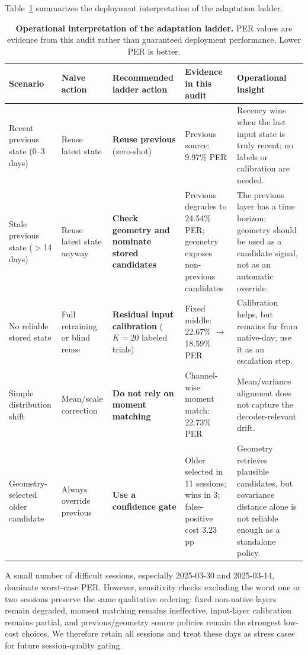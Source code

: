 \documentclass{article}
\begin{document}
Table~\ref{tab:operational-ladder} summarizes the deployment interpretation of the adaptation ladder.

\begin{table}[t]
\centering
\caption{\textbf{Operational interpretation of the adaptation ladder.} PER values are evidence from this audit rather than guaranteed deployment performance. Lower PER is better.}
\scriptsize
\setlength{\tabcolsep}{3pt}
\renewcommand{\arraystretch}{1.08}
\begin{tabular}{@{}p{}p{}p{}p{}p{}@{}}
\toprule
Scenario & Naive action & Recommended ladder action & Evidence in this audit & Operational insight \\
\midrule
Recent previous state (0--3 days) & Reuse latest state & \textbf{Reuse previous} (zero-shot) & Previous source: 9.97\% PER & Recency wins when the last input state is truly recent; no labels or calibration are needed. \\
Stale previous state ($>$14 days) & Reuse latest state anyway & \textbf{Check geometry and nominate stored candidates} & Previous degrades to 24.54\% PER; geometry exposes non-previous candidates & The previous layer has a time horizon; geometry should be used as a candidate signal, not as an automatic override. \\
No reliable stored state & Full retraining or blind reuse & \textbf{Residual input calibration} ($K=20$ labeled trials) & Fixed middle: 22.67\% $\rightarrow$ 18.59\% PER & Calibration helps, but remains far from native-day; use it as an escalation step. \\
Simple distribution shift & Mean/scale correction & \textbf{Do not rely on moment matching} & Channel-wise moment match: 22.73\% PER & Mean/variance alignment does not capture the decoder-relevant drift. \\
Geometry-selected older candidate & Always override previous & \textbf{Use a confidence gate} & Older selected in 11 sessions; wins in 3; false-positive cost 3.23 pp & Geometry retrieves plausible candidates, but covariance distance alone is not reliable enough as a standalone policy. \\
\bottomrule
\end{tabular}
\label{tab:operational-ladder}
\end{table}

A small number of difficult sessions, especially 2025-03-30 and 2025-03-14, dominate worst-case PER. However, sensitivity checks excluding the worst one or two sessions preserve the same qualitative ordering: fixed non-native layers remain degraded, moment matching remains ineffective, input-layer calibration remains partial, and previous/geometry source policies remain the strongest low-cost choices. We therefore retain all sessions and treat these days as stress cases for future session-quality gating.
\end{document}

